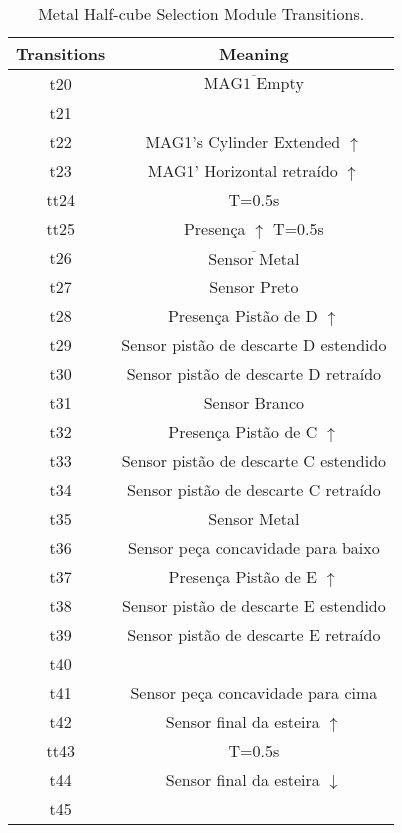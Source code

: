\begin{table}[htbp]
\caption{Metal Half-cube Selection Module Transitions.}
\centering
\begin{tabular}{cc}
Transitions & Meaning\\
\hline
t20 & \(\overline{\mbox{MAG1 Empty}}\)\\
t21 & \\
t22 & MAG1's Cylinder Extended \(\uparrow\)\\
t23 & MAG1' Horizontal retraído \(\uparrow\)\\
tt24 & T=0.5s\\
tt25 & Presença \(\uparrow\) T=0.5s\\
t26 & \(\overline{\mbox{Sensor Metal}}\)\\
t27 & Sensor Preto\\
t28 & Presença Pistão de D \(\uparrow\)\\
t29 & Sensor pistão de descarte D estendido\\
t30 & Sensor pistão de descarte D retraído\\
t31 & Sensor Branco\\
t32 & Presença Pistão de C \(\uparrow\)\\
t33 & Sensor pistão de descarte C estendido\\
t34 & Sensor pistão de descarte C retraído\\
t35 & Sensor Metal\\
t36 & Sensor peça concavidade para baixo\\
t37 & Presença Pistão de E \(\uparrow\)\\
t38 & Sensor pistão de descarte E estendido\\
t39 & Sensor pistão de descarte E retraído\\
t40 & \\
t41 & Sensor peça concavidade para cima\\
t42 & Sensor final da esteira \(\uparrow\)\\
tt43 & T=0.5s\\
t44 & Sensor final da esteira \(\downarrow\)\\
t45 & \\
\end{tabular}
\end{table}

